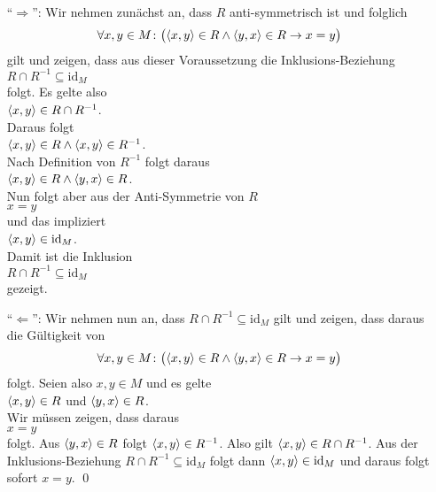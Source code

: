 \proof
\begin{enumerate}
\item[``$\Rightarrow$'':]
      Wir nehmen zun\"{a}chst an, dass $R$ anti-symmetrisch ist und folglich
      \[ \forall x, y \in M \colon \bigl(\pair(x,y) \in R \wedge \pair(y,x) \in R \rightarrow x = y\bigr) \]
      gilt und zeigen, dass aus dieser Voraussetzung die Inklusions-Beziehung
      \\[0.2cm]
      \hspace*{1.3cm}
      $R \cap R^{-1} \subseteq \mathrm{id}_{M}$ 
      \\[0.2cm]
      folgt.  Es gelte also
      \\[0.2cm]
      \hspace*{1.3cm}
      $\pair(x,y) \in R \cap R^{-1}$.
      \\[0.2cm]
      Daraus folgt
      \\[0.2cm]
      \hspace*{1.3cm}
      $\pair(x,y) \in R \wedge \pair(x,y) \in R^{-1}$.
      \\[0.2cm]
      Nach Definition von $R^{-1}$ folgt daraus
      \\[0.2cm]
      \hspace*{1.3cm}
      $\pair(x,y) \in R \wedge \pair(y,x) \in R$.
      \\[0.2cm]
      Nun folgt aber aus der Anti-Symmetrie von $R$ 
      \\[0.2cm]
      \hspace*{1.3cm}
      $x=y$
      \\[0.2cm]
      und das impliziert
      \\[0.2cm]
      \hspace*{1.3cm}
      $\pair(x,y) \in \mathrm{id}_M$.
      \\[0.2cm]
      Damit ist die Inklusion
      \\[0.2cm]
      \hspace*{1.3cm}
      $R \cap R^{-1} \subseteq \mathrm{id}_{M}$ 
      \\[0.2cm]
      gezeigt.
\item[``$\Leftarrow$'':]
      Wir nehmen nun an, dass $R \cap R^{-1} \subseteq \mathrm{id}_{M}$ gilt und zeigen, dass daraus
      die G\"{u}ltigkeit von 
      \[ \forall x, y \in M \colon \bigl(\pair(x,y) \in R \wedge \pair(y,x) \in R \rightarrow x = y\bigr) \]
      folgt.  Seien also $x,y \in M$ und es gelte
      \\[0.2cm]
      \hspace*{1.3cm}
      $\pair(x,y) \in R$ und $\pair(y,x) \in R$.
      \\[0.2cm]
      Wir m\"{u}ssen zeigen, dass daraus
      \\[0.2cm]
      \hspace*{1.3cm}
      $x=y$ 
      \\[0.2cm]
      folgt.  Aus $\pair(y,x) \in R$ folgt 
      $\pair(x,y) \in R^{-1}$.  Also gilt $\pair(x,y) \in R \cap R^{-1}$.
      Aus der Inklusions-Beziehung $R \cap R^{-1} \subseteq \mathrm{id}_{M}$ folgt dann
      $\pair(x,y) \in \mathrm{id}_M$ und daraus folgt sofort $x = y$. 
      \qed
\end{enumerate}

